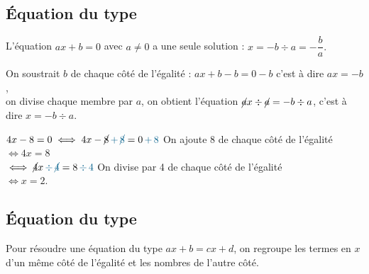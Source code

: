 \subsection{Équation du type } %

\begin{propriete}[Solution]
   L'équation $ax+b =0$ avec $a\neq0$ a une seule solution : $x =-b\div a=-\dfrac{b}{a}.$
\end{propriete}

\begin{preuve}
   On soustrait $b$ de chaque côté de l'égalité : $ax+b-b =0-b$ c'est à dire $ax =-b$, \\
   on divise chaque membre par $a$, on obtient l'équation $\cancel ax\div \cancel a=-b\div a$, c'est à dire $x=-b\div a$.
\end{preuve}

\begin{exemple*1}
   $4x-8 =0 \iff 4x-\cancel8\,\textcolor{A1}{+\,\cancel8} =0\,\textcolor{A1}{+\,8}$ \hfill On ajoute 8 de chaque côté de l'égalité \\
   \hspace*{3.2cm} $\iff 4x =8$ \\
   \hspace*{3.2cm} $\iff \cancel4x\,\textcolor{A1}{\div\,\cancel4} =8\,\textcolor{A1}{\div\,4}$ \hfill On divise par 4 de chaque côté de l'égalité \\
   \hspace*{3.2cm} $\iff x =2$.  
\end{exemple*1}

\subsection{Équation du type } %

\begin{propriete}[Résolution]
   Pour résoudre une équation du type $ax+b=cx+d$, on regroupe les termes \og en $x$ \fg{} d'un même côté de l'égalité et les nombres de l'autre côté.
\end{propriete}

